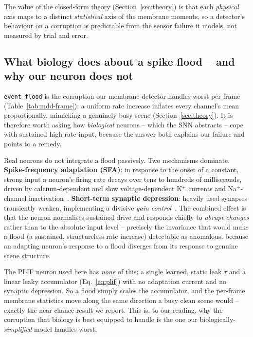 The value of the closed-form theory (Section~\ref{sec:theory}) is that each \emph{physical}
axis maps to a distinct \emph{statistical} axis of the membrane moments, so a detector's
behaviour on a corruption is predictable from the sensor failure it models, not measured by
trial and error.

\subsection{What biology does about a spike flood -- and why our neuron does not}
\label{sec:discussion-bio}

\texttt{event\_flood} is the corruption our membrane detector handles worst per-frame
(Table~\ref{tab:mdd-frame}): a uniform rate increase inflates every channel's mean
proportionally, mimicking a genuinely busy scene (Section~\ref{sec:theory}). It is therefore
worth asking how \emph{biological} neurons -- which the SNN abstracts -- cope with sustained
high-rate input, because the answer both explains our failure and points to a remedy.

Real neurons do not integrate a flood passively. Two mechanisms dominate.
\textbf{Spike-frequency adaptation (SFA)}: in response to the onset of a constant, strong
input a neuron's firing rate decays over tens to hundreds of milliseconds, driven by
calcium-dependent and slow voltage-dependent K$^+$ currents and Na$^+$-channel
inactivation~\cite{benda2003sfa,gabbiani2014sfa}. \textbf{Short-term synaptic depression}:
heavily used synapses transiently weaken, implementing a divisive \emph{gain
control}~\cite{abbott1997depression,rothman2009gaincontrol}. The combined effect is that the
neuron normalises sustained drive and responds chiefly to \emph{abrupt changes} rather than
to the absolute input level -- precisely the invariance that would make a flood (a sustained,
structureless rate increase) detectable as anomalous, because an adapting neuron's response to
a flood diverges from its response to genuine scene structure.

The PLIF neuron used here has \emph{none} of this: a single learned, static leak $\tau$ and a
linear leaky accumulator (Eq.~\ref{eq:plif}) with no adaptation current and no synaptic
depression. So a flood simply scales the accumulator, and the per-frame membrane statistics
move along the same direction a busy clean scene would -- exactly the near-chance result we
report. This is, to our reading, why the corruption that biology is best equipped to handle is
the one our biologically-\emph{simplified} model handles worst.

